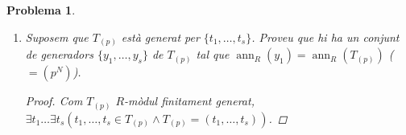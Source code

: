 \documentclass[compress]{article}
\newtheorem{problema}{Problema}
\theoremstyle{definition}
\DeclareMathOperator{\ann}{ann}
\begin{document}
\begin{problema}
\begin{enumerate}
\begin{proof}
\begin{align*}
                &\quad&\textrm{(Per definició de $\ann_{R}(t)$)}\\
                &=\bigcap_{t\in T_{(p)}}\ann_{R}(t)
                &\quad&\textrm{(Per definició de $\cap$)}\\
                &\subset\ann_{R}(t)
                &\quad&\textrm{($t\neq0_{R}$)}\\
                &\subsetneq R
            \end{align*}
            com volíem veure.\newline
            Veiem que $\exists N(N\in\mathbb{N}\land\ann_{R}(T_{(p)})=(p^{N}))$. Com $\ann_{R}(T_{(p)})$ és ideal de $R$ i $R$ és DIP, $\exists r(r\in R\land\ann_{R}(T_{(p)})=(r))$. Sigui $r'\in\ann_{R}(T_{(p)})$. Tenim que $\forall t(t\in T_{(p)}\Rightarrow r't=0_{R})$, $\exists r''(r''\in R\land r'=rr'')$ i $\exists n(n\in\mathbb{N}\land p^{n}t=0_{R})$ (ja que $t\in T_{(p)}$). Aleshores,
            \begin{align*}
                (p^{n}-rr'')t
                &=p^{n}t-rr''t
                &\quad&\textrm{()}\\
                &=p^{n}t-r't
                &\quad&\textrm{()}\\
                &=0_{R}-0_{R}
                &\quad&\textrm{()}\\
                &=0_{R}
            \end{align*}
            Sense pèrdua de la generalitat podem suposar que $t\neq0_{R}$ ($T_{(p)}\neq\{0_{R}\}$). Com $R$ és domini, deduïm que $p^{n}-rr''=0_{R}$ (d'on $p^{n}=rr'$). Com $p$ primer i $R$ DFU, $\exists u\exists n'(u\in U(R),n'\leq n\land r=up^{n'})$. Per tant,
            \begin{align*}
                \ann_{R}(T_{(p)})
                &=(r)\\
                &=(up^{n'})
                &\quad&\textrm{($r=up^{n'}$)}\\
                &=(p^{n'})
                &\quad&\textrm{($u\in U(R)$)}
            \end{align*}
            com volíem veure.
        \end{proof}
        \item Suposem que $T_{(p)}$ està generat per $\{t_{1},\ldots,t_{s}\}$. Proveu que hi ha un conjunt de generadors $\{y_{1},\ldots,y_{s}\}$ de $T_{(p)}$ tal que $\ann_{R}(y_{1})=\ann_{R}(T_{(p)})$ ($=(p^{N})$).
        \begin{proof}
            Com $T_{(p)}$ $R$-mòdul finitament generat, $\exists t_{1}\ldots\exists t_{s}(t_{1},\ldots,t_{s}\in T_{(p)}\land T_{(p)}=(t_{1},\ldots,t_{s}))$.\newline

\end{proof}
\end{enumerate}
\end{problema}
\end{document}

